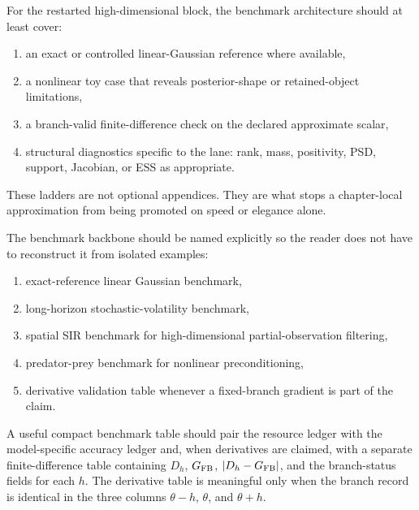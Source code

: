 For the restarted high-dimensional block, the benchmark architecture should at
least cover:
\begin{enumerate}[label=(\arabic*), leftmargin=0.28in]
  \item an exact or controlled linear-Gaussian reference where available,
  \item a nonlinear toy case that reveals posterior-shape or retained-object
  limitations,
  \item a branch-valid finite-difference check on the declared approximate scalar,
  \item structural diagnostics specific to the lane: rank, mass, positivity,
  PSD, support, Jacobian, or ESS as appropriate.
\end{enumerate}
These ladders are not optional appendices.  They are what stops a chapter-local
approximation from being promoted on speed or elegance alone.

The benchmark backbone should be named explicitly so the reader does not have to
reconstruct it from isolated examples:
\begin{enumerate}[label=(V\arabic*), leftmargin=0.34in]
  \item exact-reference linear Gaussian benchmark,
  \item long-horizon stochastic-volatility benchmark,
  \item spatial SIR benchmark for high-dimensional partial-observation filtering,
  \item predator-prey benchmark for nonlinear preconditioning,
  \item derivative validation table whenever a fixed-branch gradient is part of
  the claim.
\end{enumerate}
A useful compact benchmark table should pair the resource ledger with the
model-specific accuracy ledger and, when derivatives are claimed, with a separate
finite-difference table containing \(D_h\), \(G_{\rm FB}\), \(|D_h-G_{\rm FB}|\),
and the branch-status fields for each \(h\).  The derivative table is meaningful
only when the branch record is identical in the three columns
\(\theta-h\), \(\theta\), and \(\theta+h\).

